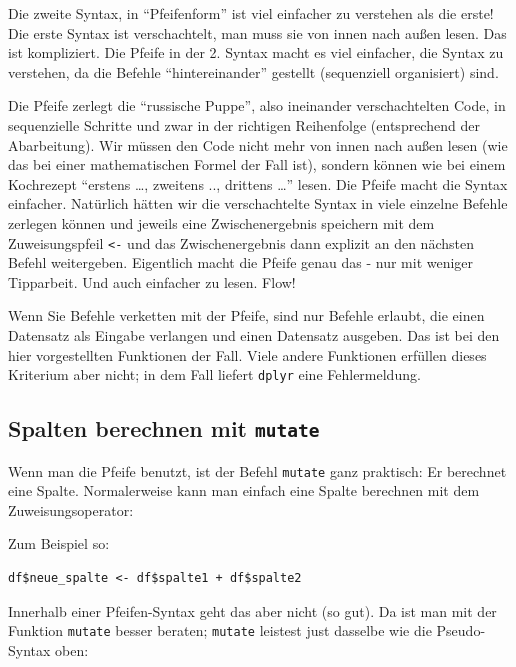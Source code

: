 \documentclass[12pt,ngerman,]{book}
\theoremstyle{definition}
\theoremstyle{definition}
\theoremstyle{remark}
\let\BeginKnitrBlock\begin \let\EndKnitrBlock\end
\begin{document}
Die zweite Syntax, in ``Pfeifenform'' ist viel einfacher zu verstehen
als die erste! Die erste Syntax ist verschachtelt, man muss sie von
innen nach außen lesen. Das ist kompliziert. Die Pfeife in der 2. Syntax
macht es viel einfacher, die Syntax zu verstehen, da die Befehle
``hintereinander'' gestellt (sequenziell organisiert) sind.

Die Pfeife zerlegt die ``russische Puppe'', also ineinander
verschachtelten Code, in sequenzielle Schritte und zwar in der richtigen
Reihenfolge (entsprechend der Abarbeitung). Wir müssen den Code nicht
mehr von innen nach außen lesen (wie das bei einer mathematischen Formel
der Fall ist), sondern können wie bei einem Kochrezept ``erstens
\ldots{}, zweitens .., drittens \ldots{}'' lesen. Die Pfeife macht die
Syntax einfacher. Natürlich hätten wir die verschachtelte Syntax in
viele einzelne Befehle zerlegen können und jeweils eine Zwischenergebnis
speichern mit dem Zuweisungspfeil \texttt{\textless{}-} und das
Zwischenergebnis dann explizit an den nächsten Befehl weitergeben.
Eigentlich macht die Pfeife genau das - nur mit weniger Tipparbeit. Und
auch einfacher zu lesen. Flow!

\BeginKnitrBlock{rmdcaution}
Wenn Sie Befehle verketten mit der Pfeife, sind nur Befehle erlaubt, die
einen Datensatz als Eingabe verlangen und einen Datensatz ausgeben. Das
ist bei den hier vorgestellten Funktionen der Fall. Viele andere
Funktionen erfüllen dieses Kriterium aber nicht; in dem Fall liefert
\texttt{dplyr} eine Fehlermeldung.
\EndKnitrBlock{rmdcaution}

\subsection{\texorpdfstring{Spalten berechnen mit
\texttt{mutate}}{Spalten berechnen mit mutate}}\label{spalten-berechnen-mit-mutate}

Wenn man die Pfeife benutzt, ist der Befehl
\texttt{mutate} ganz praktisch: Er berechnet eine
Spalte. Normalerweise kann man einfach eine Spalte berechnen mit dem
Zuweisungsoperator:

Zum Beispiel so:

\begin{verbatim}
df$neue_spalte <- df$spalte1 + df$spalte2
\end{verbatim}

Innerhalb einer Pfeifen-Syntax geht das aber nicht (so gut). Da ist man
mit der Funktion \texttt{mutate} besser beraten; \texttt{mutate}
leistest just dasselbe wie die Pseudo-Syntax oben:
\end{document}
